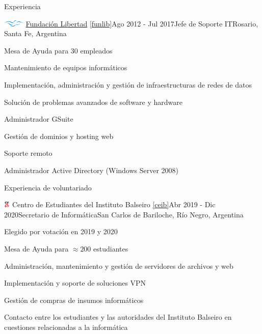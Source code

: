 \documentclass{resume} %
\begin{document}
\begin{rSection}{Experiencia}
    \begin{rSubsection}{\includegraphics[height=0.3cm]{images/fl.png} \href{https://libertad.org.ar/}{Fundación Libertad} \ref{funlib}}{Ago 2012 - Jul 2017}{Jefe de Soporte IT}{Rosario, Santa Fe, Argentina}
        \item Mesa de Ayuda para 30 empleados
        \item Mantenimiento de equipos informáticos
        \item Implementación, administración y gestión de infraestructuras de redes de datos
        \item Solución de problemas avanzados de software y hardware
        \item Administrador GSuite
        \item Gestión de dominios y hosting web
        \item Soporte remoto
        \item Administrador Active Directory (Windows Server 2008)
    \end{rSubsection}


\end{rSection}


\begin{rSection}{Experiencia de voluntariado}
    \begin{rSubsection}{\includegraphics[height=0.3cm]{images/ceib.png} Centro de Estudiantes del Instituto Balseiro \ref{ceib}}{Abr 2019 - Dic 2020}{Secretario de Informática}{San Carlos de Bariloche, Río Negro, Argentina}
        \item Elegido por votación en 2019 y 2020
        \item Mesa de Ayuda para $\approx 200$ estudiantes
        \item Administración, mantenimiento y gestión de servidores de archivos y web
        \item Implementación y soporte de soluciones VPN
        \item Gestión de compras de insumos informáticos
        \item Contacto entre los estudiantes y las autoridades del Instituto Balseiro en cuestiones relacionadas a la informática
    \end{rSubsection}


\end{rSection}
\end{document}
